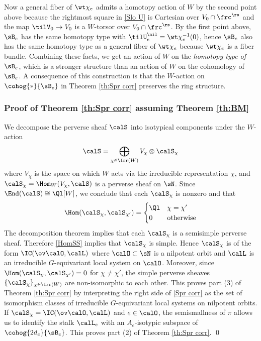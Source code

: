 Now a general fiber of $\wt\chi_{e}$ admits a homotopy action of $W$ by the second point above because the rightmost  square in \eqref{Slo U} is Cartesian over $V_{0}\cap\frc^{\rs}$ and the map $\tilV_{0}\to V_{0}$ is a $W$-torsor over $V_{0}\cap\frc^{\rs}$. By the first point above, $\sB_{e}$ has the same homotopy type with $\tilU^{\nil}_{e}=\wt\chi^{-1}_{e}(0)$, hence $\sB_{e}$ also has the same homotopy type as a general fiber of $\wt\chi_{e}$ because $\wt\chi_{e}$ is a fiber bundle. Combining these facts, we get an action of $W$ on the {\em homotopy type of $\sB_{e}$}, which is a stronger structure than an action of $W$ on the cohomology of $\sB_{e}$. A consequence of this construction is that the $W$-action on $\cohog{*}{\sB_{e}}$ in Theorem  \ref{th:Spr corr} preserves the ring structure.


 

\subsubsection{Proof of Theorem \ref{th:Spr corr} assuming Theorem \ref{th:BM}}
We decompose the perverse sheaf $\calS$ into isotypical components under the $W$-action
\begin{equation*}
\calS=\bigoplus_{\chi\in\Irr(W)}V_{\chi}\otimes\calS_{\chi}
\end{equation*}
where $V_{\chi}$ is the space on which $W$ acts via the irreducible representation $\chi$, and $\calS_{\chi}=\Hom_{W}(V_{\chi},\calS)$ is a perverse sheaf on $\sN$. Since $\End(\calS)\cong\Ql[W]$, we conclude that
each $\calS_{\chi}$ is nonzero and that
\begin{equation}\label{HomSS}
\Hom(\calS_{\chi},\calS_{\chi'})=\begin{cases}\Ql & \chi=\chi' \\ 0 & \textup{otherwise}\end{cases}
\end{equation}
The decomposition theorem \cite[Th 6.2.5]{BBD} implies that each $\calS_{\chi}$ is a semisimple perverse sheaf. Therefore \eqref{HomSS} implies that $\calS_{\chi}$ is simple. Hence $\calS_{\chi}$ is of the form $\IC(\ov\calO, \calL)$ where $\calO\subset\sN$ is a nilpotent orbit and $\calL$ is an irreducible  $G$-equivariant local system on $\calO$. Moreover, since $\Hom(\calS_{\chi},\calS_{\chi'})=0$ for $\chi\neq\chi'$, the simple perverse sheaves $\{\calS_{\chi}\}_{\chi\in\Irr(W)}$ are non-isomorphic to each other. This proves part (3) of Theorem \ref{th:Spr corr} by interpreting the right side of \eqref{Spr corr} as the set of isomorphism classes of irreducible $G$-equivariant local systems on nilpotent orbits. If $\calS_{\chi}=\IC(\ov\calO,\calL)$ and $e\in\calO$, the semismallness of $\pi$ allows us to identify the stalk $\calL_{e}$ with an $A_{e}$-isotypic subspace of $\cohog{2d_{e}}{\sB_{e}}$. This proves part (2) of Theorem \ref{th:Spr corr}. \qed



